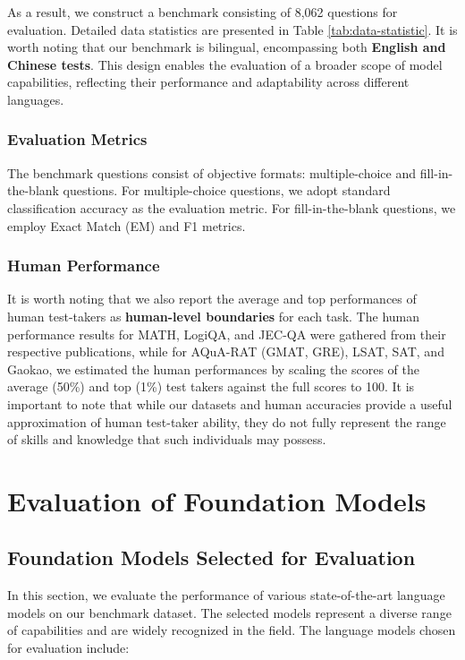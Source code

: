 As a result, we construct a benchmark consisting of 8,062 questions for evaluation. Detailed data statistics are presented in Table \ref{tab:data-statistic}. It is worth noting that our benchmark is bilingual, encompassing both \textbf{English and Chinese tests}. This design enables the evaluation of a broader scope of model capabilities, reflecting their performance and adaptability across different languages. 

\subsubsection{Evaluation Metrics} The benchmark questions consist of objective formats: multiple-choice and fill-in-the-blank questions. For multiple-choice questions, we adopt standard classification accuracy as the evaluation metric. For fill-in-the-blank questions, we employ Exact Match (EM) and F1 metrics. 

\subsubsection{Human Performance} It is worth noting that we also report the average and top performances of human test-takers as  \textbf{human-level boundaries} for each task. The human performance results for MATH, LogiQA, and JEC-QA were gathered from their respective publications, while for AQuA-RAT (GMAT, GRE), LSAT, SAT, and Gaokao, we estimated the human performances by scaling the scores of the average (50\%) and top (1\%) test takers against the full scores to 100. It is important to note that while our datasets and human accuracies provide a useful approximation of human test-taker ability, they do not fully represent the range of skills and knowledge that such individuals may possess.

\section{Evaluation of Foundation Models}
\subsection{Foundation Models Selected for Evaluation} In this section, we evaluate the performance of various state-of-the-art language models on our benchmark dataset. The selected models represent a diverse range of capabilities and are widely recognized in the field. The language models chosen for evaluation include:

